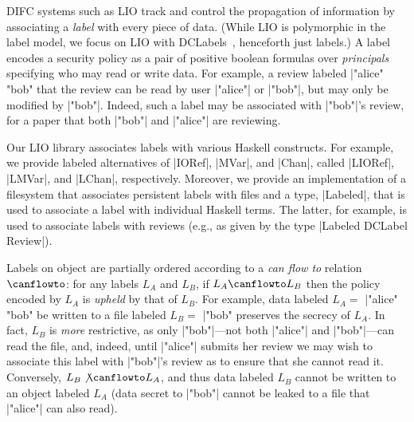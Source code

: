 
\label{sec:overview}

DIFC systems such as LIO track and control the propagation of
information by associating a \emph{label} with every piece of data.
%
(While LIO is polymorphic in the label model, we focus on LIO with
DCLabels~\cite{dclabels}, henceforth just labels.)
%
A label encodes a security policy as a pair of positive boolean
formulas over \emph{principals} specifying who may read or write data.
%
For example, a review labeled \hs|"alice" \/ "bob" %
that the review can be read by user \hs|"alice"| or \hs|"bob"|, but
may only be modified by \hs|"bob"|.
%
Indeed, such a label may be associated with \hs|"bob"|'s review, for a
paper that both \hs|"bob"| and \hs|"alice"| are reviewing.
%

Our LIO library associates labels with various Haskell constructs.
%
For example, we provide labeled alternatives of \hs|IORef|, \hs|MVar|,
and \hs|Chan|, called \hs|LIORef|, \hs|LMVar|, and \hs|LChan|,
respectively.
%
Moreover, we provide an implementation of a filesystem that associates
persistent labels with files and a type, \hs|Labeled|, that is used to
associate a label with individual Haskell terms.
%
The latter, for example, is used to associate labels with reviews (e.g.,
as given by the type \hs|Labeled DCLabel Review|).

Labels on object are partially ordered according to a {\em can flow
  to} relation $\canflowto$: for any labels $L_A$ and $L_B$, if $L_A
  \canflowto L_B$ then the policy encoded by $L_A$ is \emph{upheld}
  by that of $L_B$.
%
For example, data labeled $L_A =$ \hs|"alice" \/ "bob" %
be written to a file labeled $L_B =$ \hs|"bob" %
preserves the secrecy of $L_A$.
%
In fact, $L_B$ is \emph{more} restrictive, as only
\hs|"bob"|---not both \hs|"alice"| and \hs|"bob"|---can read the file,
and, indeed, until \hs|"alice"| submits her review we may wish to
associate this label with \hs|"bob"|'s review as to ensure that she
cannot read it.
%
Conversely, $L_B \not\canflowto L_A$, and thus data labeled $L_B$
cannot be written to an object labeled $L_A$ (data secret to
\hs|"bob"| cannot be leaked to a file that \hs|"alice"| can also
read).

